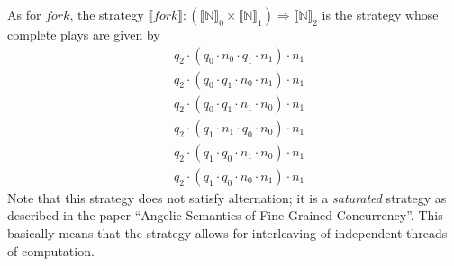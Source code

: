\documentclass{article}
\begin{document}
As for $fork$, the strategy $\llbracket fork \rrbracket : (\llbracket \mathbb{N}
\rrbracket_0 \times \llbracket \mathbb{N} \rrbracket_1) \Rightarrow
\llbracket \mathbb{N} \rrbracket_2$ is the strategy whose complete plays are
given by
\begin{align*}
&q_2 \cdot (q_0 \cdot n_0 \cdot q_1 \cdot n_1) \cdot n_1\\
&q_2 \cdot (q_0 \cdot q_1 \cdot n_0 \cdot n_1) \cdot n_1\\
&q_2 \cdot (q_0 \cdot q_1 \cdot n_1 \cdot n_0) \cdot n_1\\
&q_2 \cdot (q_1 \cdot n_1 \cdot q_0 \cdot n_0) \cdot n_1\\
&q_2 \cdot (q_1 \cdot q_0 \cdot n_1 \cdot n_0) \cdot n_1\\
&q_2 \cdot (q_1 \cdot q_0 \cdot n_0 \cdot n_1) \cdot n_1
\end{align*}
Note that this strategy does not satisfy alternation; it is a \textit{saturated}
strategy as described in the paper ``Angelic Semantics of Fine-Grained
Concurrency''. This basically means that the strategy allows for interleaving of
independent threads of computation.
\end{document}
